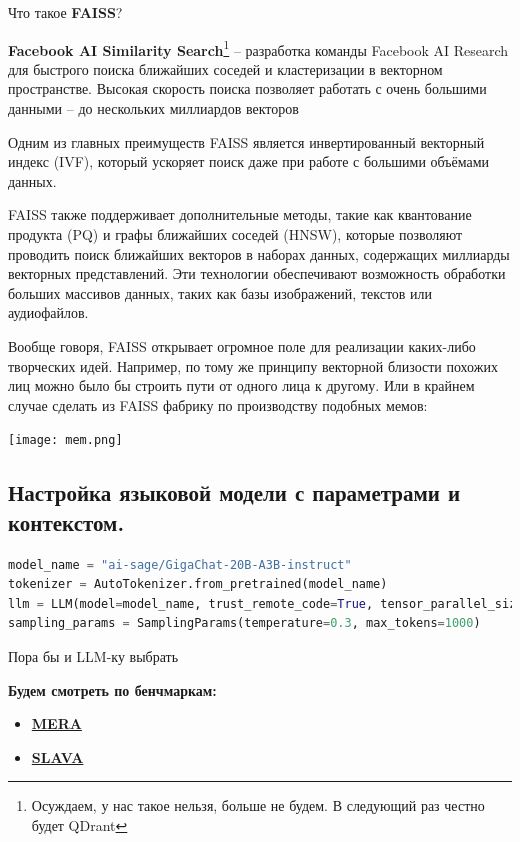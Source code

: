 \documentclass{article}
\begin{document}
Что такое \textbf{FAISS}?

\textbf{Facebook AI Similarity Search}\footnote{Осуждаем, у нас такое нельзя, больше не будем. В следующий раз честно будет QDrant} – разработка команды Facebook AI Research для быстрого поиска ближайших соседей и кластеризации в векторном пространстве. Высокая скорость поиска позволяет работать с очень большими данными – до нескольких миллиардов векторов

Одним из главных преимуществ FAISS является инвертированный векторный индекс (IVF), который ускоряет поиск даже при работе с большими объёмами данных.

FAISS также поддерживает дополнительные методы, такие как квантование продукта (PQ) и графы ближайших соседей (HNSW), которые позволяют проводить поиск ближайших векторов в наборах данных, содержащих миллиарды векторных представлений. Эти технологии обеспечивают возможность обработки больших массивов данных, таких как базы изображений, текстов или аудиофайлов.

Вообще говоря, FAISS открывает огромное поле для реализации каких-либо творческих идей. Например, по тому же принципу векторной близости похожих лиц можно было бы строить пути от одного лица к другому. Или в крайнем случае сделать из FAISS фабрику по производству подобных мемов:

\texttt{[image: mem.png]}


\subsection{Настройка языковой модели с параметрами и контекстом.}

\begin{lstlisting}[language=Python, label=code:example]
model_name = "ai-sage/GigaChat-20B-A3B-instruct"
tokenizer = AutoTokenizer.from_pretrained(model_name)
llm = LLM(model=model_name, trust_remote_code=True, tensor_parallel_size=2, max_model_len=24000)
sampling_params = SamplingParams(temperature=0.3, max_tokens=1000)
\end{lstlisting}

Пора бы и LLM-ку выбрать

\textbf{Будем смотреть по бенчмаркам:}
\begin{itemize}
    \item \textbf{\href{https://mera.a-ai.ru/ru/leaderboard}{MERA}}
    \item \textbf{\href{https://huggingface.co/datasets/RANEPA-ai/SLAVA-OpenData-2800-v1}{SLAVA}}
\end{itemize}
\end{document}
